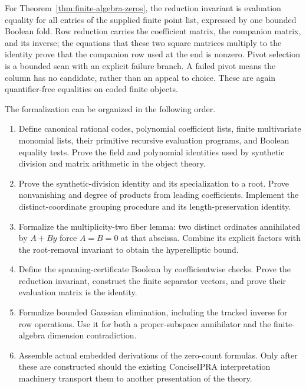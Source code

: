 For Theorem~\ref{thm:finite-algebra-zeros}, the reduction invariant is
evaluation equality for all entries of the supplied finite point list,
expressed by one bounded Boolean fold.  Row reduction carries the
coefficient matrix, the companion matrix, and its inverse; the equations
that these two square matrices multiply to the identity prove that the
companion row used at the end is nonzero.  Pivot selection is a bounded
scan with an explicit failure branch.  A failed pivot means the column
has no candidate, rather than an appeal to choice.  These are again
quantifier-free equalities on coded finite objects.

The formalization can be organized in the following order.
\begin{enumerate}
\item Define canonical rational codes, polynomial coefficient lists, finite
multivariate monomial lists, their primitive recursive evaluation
programs, and Boolean equality tests.  Prove the field and polynomial
identities used by synthetic division and matrix arithmetic in the
object theory.
\item Prove the synthetic-division identity and its specialization to a
root.  Prove nonvanishing and degree of products from leading coefficients.
Implement the distinct-coordinate grouping procedure and its
length-preservation identity.
\item Formalize the multiplicity-two fiber lemma: two distinct ordinates
annihilated by $A+B y$ force $A=B=0$ at that abscissa.  Combine its
explicit factors with the root-removal invariant to obtain the
hyperelliptic bound.
\item Define the spanning-certificate Boolean by coefficientwise checks.
Prove the reduction invariant, construct the finite separator vectors,
and prove their evaluation matrix is the identity.
\item Formalize bounded Gaussian elimination, including the tracked
inverse for row operations.  Use it for both a proper-subspace
annihilator and the finite-algebra dimension contradiction.
\item Assemble actual embedded derivations of the zero-count formulas.
Only after these are constructed should the existing ConciseIPRA
interpretation machinery transport them to another presentation of the
theory.
\end{enumerate}

